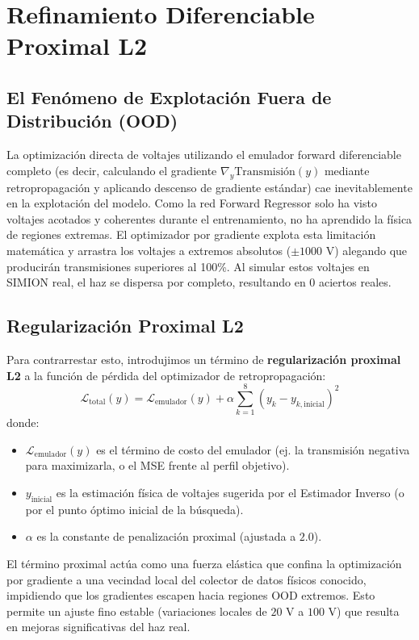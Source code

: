 \documentclass[12pt,letterpaper]{article}
\begin{document}
\section{Refinamiento Diferenciable Proximal L2}
\label{sec:refinement}
\subsection{El Fenómeno de Explotación Fuera de Distribución (OOD)}
La optimización directa de voltajes utilizando el emulador forward diferenciable completo (es decir, calculando el gradiente $\nabla_y \text{Transmisión}(y)$ mediante retropropagación y aplicando descenso de gradiente estándar) cae inevitablemente en la explotación del modelo. Como la red Forward Regressor solo ha visto voltajes acotados y coherentes durante el entrenamiento, no ha aprendido la física de regiones extremas. El optimizador por gradiente explota esta limitación matemática y arrastra los voltajes a extremos absolutos ($\pm 1000\text{ V}$) alegando que producirán transmisiones superiores al 100\%. Al simular estos voltajes en SIMION real, el haz se dispersa por completo, resultando en 0 aciertos reales.

\subsection{Regularización Proximal L2}
Para contrarrestar esto, introdujimos un término de \textbf{regularización proximal L2} a la función de pérdida del optimizador de retropropagación:
\begin{equation}
    \mathcal{L}_{\text{total}}(y) = \mathcal{L}_{\text{emulador}}(y) + \alpha \sum_{k=1}^8 \left( y_k - y_{k,\text{inicial}} \right)^2
\end{equation}
donde:
\begin{itemize}
    \item $\mathcal{L}_{\text{emulador}}(y)$ es el término de costo del emulador (ej. la transmisión negativa para maximizarla, o el MSE frente al perfil objetivo).
    \item $y_{\text{inicial}}$ es la estimación física de voltajes sugerida por el Estimador Inverso (o por el punto óptimo inicial de la búsqueda).
    \item $\alpha$ es la constante de penalización proximal (ajustada a $2.0$).
\end{itemize}
El término proximal actúa como una fuerza elástica que confina la optimización por gradiente a una vecindad local del colector de datos físicos conocido, impidiendo que los gradientes escapen hacia regiones OOD extremos. Esto permite un ajuste fino estable (variaciones locales de $20\text{ V}$ a $100\text{ V}$) que resulta en mejoras significativas del haz real.
\end{document}
